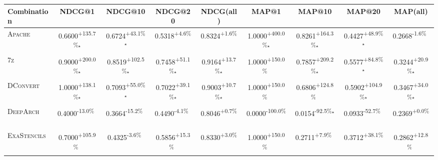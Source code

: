 \begin{table}[htbp]
\centering
\renewcommand{\arraystretch}{1.2}
\begin{tabular}{l|cccc|cccc}
\hline
Combination & NDCG@1 & NDCG@10 & NDCG@20 & NDCG(all) & MAP@1 & MAP@10 & MAP@20 & MAP(all) \\ \hline
\textsc{Apache} & \cellcolor{green!30}0.6600\textsuperscript{+135.7\%}$^\star$ & \cellcolor{green!30}0.6724\textsuperscript{+43.1\%}$^\star$ & \cellcolor{green!30}0.5318\textsuperscript{+4.6\%}$^{\,\,\,}$ & \cellcolor{green!30}0.8324\textsuperscript{+1.6\%}$^{\,\,\,}$ & \cellcolor{green!30}1.0000\textsuperscript{+400.0\%}$^\star$ & \cellcolor{green!30}0.8261\textsuperscript{+164.3\%}$^\star$ & \cellcolor{green!30}0.4427\textsuperscript{+48.9\%}$^\star$ & \cellcolor{red!30}0.2668\textsuperscript{-1.6\%}$^{\,\,\,}$ \\
\textsc{7z} & \cellcolor{green!30}0.9000\textsuperscript{+200.0\%}$^\star$ & \cellcolor{green!30}0.8519\textsuperscript{+102.5\%}$^\star$ & \cellcolor{green!30}0.7458\textsuperscript{+51.1\%}$^\star$ & \cellcolor{green!30}0.9164\textsuperscript{+13.7\%}$^\star$ & \cellcolor{green!30}1.0000\textsuperscript{+150.0\%}$^{\,\,\,}$ & \cellcolor{green!30}0.7857\textsuperscript{+209.2\%}$^\star$ & \cellcolor{green!30}0.5577\textsuperscript{+84.8\%}$^\star$ & \cellcolor{green!30}0.3244\textsuperscript{+20.9\%}$^\star$ \\
\textsc{DConvert} & \cellcolor{green!30}1.0000\textsuperscript{+138.1\%}$^\star$ & \cellcolor{green!30}0.7093\textsuperscript{+55.0\%}$^\star$ & \cellcolor{green!30}0.7022\textsuperscript{+39.1\%}$^\star$ & \cellcolor{green!30}0.9003\textsuperscript{+10.7\%}$^\star$ & \cellcolor{green!30}1.0000\textsuperscript{+150.0\%}$^{\,\,\,}$ & \cellcolor{green!30}0.6806\textsuperscript{+124.8\%}$^{\,\,\,}$ & \cellcolor{green!30}0.5902\textsuperscript{+104.9\%}$^\star$ & \cellcolor{green!30}0.3467\textsuperscript{+34.0\%}$^\star$ \\
\textsc{DeepArch} & \cellcolor{red!30}0.4000\textsuperscript{-13.0\%}$^{\,\,\,}$ & \cellcolor{red!30}0.3664\textsuperscript{-15.2\%}$^{\,\,\,}$ & \cellcolor{red!30}0.4490\textsuperscript{-4.1\%}$^{\,\,\,}$ & \cellcolor{green!30}0.8046\textsuperscript{+0.7\%}$^{\,\,\,}$ & \cellcolor{red!30}0.0000\textsuperscript{-100.0\%}$^{\,\,\,}$ & \cellcolor{red!30}0.0154\textsuperscript{-92.5\%}$^\star$ & \cellcolor{red!30}0.0933\textsuperscript{-52.7\%}$^{\,\,\,}$ & \cellcolor{green!30}0.2369\textsuperscript{+0.0\%}$^{\,\,\,}$ \\
\textsc{ExaStencils} & \cellcolor{green!30}0.7000\textsuperscript{+105.9\%}$^{\,\,\,}$ & \cellcolor{red!30}0.4325\textsuperscript{-3.6\%}$^{\,\,\,}$ & \cellcolor{green!30}0.5856\textsuperscript{+15.3\%}$^{\,\,\,}$ & \cellcolor{green!30}0.8330\textsuperscript{+3.0\%}$^{\,\,\,}$ & \cellcolor{green!30}1.0000\textsuperscript{+150.0\%}$^{\,\,\,}$ & \cellcolor{green!30}0.2711\textsuperscript{+7.9\%}$^{\,\,\,}$ & \cellcolor{green!30}0.3712\textsuperscript{+38.1\%}$^{\,\,\,}$ & \cellcolor{green!30}0.2862\textsuperscript{+12.8\%}$^{\,\,\,}$ \\

\end{tabular}
\end{table}
